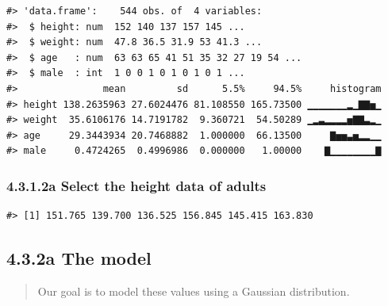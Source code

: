 \documentclass[
  letterpaper,
  DIV=11,
  numbers=noendperiod]{scrreprt}
\newenvironment{Shaded}{\begin{snugshade}}{\end{snugshade}}
\newcommand{\CommentTok}[1]{\textcolor[rgb]{0.37,0.37,0.37}{#1}}
\newcommand{\DecValTok}[1]{\textcolor[rgb]{0.68,0.00,0.00}{#1}}
\newcommand{\DocumentationTok}[1]{\textcolor[rgb]{0.37,0.37,0.37}{\textit{#1}}}
\newcommand{\FunctionTok}[1]{\textcolor[rgb]{0.28,0.35,0.67}{#1}}
\newcommand{\InformationTok}[1]{\textcolor[rgb]{0.37,0.37,0.37}{#1}}
\newcommand{\NormalTok}[1]{\textcolor[rgb]{0.00,0.23,0.31}{#1}}
\newcommand{\OtherTok}[1]{\textcolor[rgb]{0.00,0.23,0.31}{#1}}
\newcommand{\SpecialCharTok}[1]{\textcolor[rgb]{0.37,0.37,0.37}{#1}}
\begin{document}
\begin{verbatim}
#> 'data.frame':    544 obs. of  4 variables:
#>  $ height: num  152 140 137 157 145 ...
#>  $ weight: num  47.8 36.5 31.9 53 41.3 ...
#>  $ age   : num  63 63 65 41 51 35 32 27 19 54 ...
#>  $ male  : int  1 0 0 1 0 1 0 1 0 1 ...
#>               mean         sd      5.5%     94.5%     histogram
#> height 138.2635963 27.6024476 81.108550 165.73500 ▁▁▁▁▁▁▁▂▁▇▇▅▁
#> weight  35.6106176 14.7191782  9.360721  54.50289 ▁▂▃▂▂▂▂▅▇▇▃▂▁
#> age     29.3443934 20.7468882  1.000000  66.13500     ▇▅▅▃▅▂▂▁▁
#> male     0.4724265  0.4996986  0.000000   1.00000    ▇▁▁▁▁▁▁▁▁▇
\end{verbatim}

\hypertarget{a-select-the-height-data-of-adults}{%
\subsubsection{4.3.1.2a Select the height data of
adults}\label{a-select-the-height-data-of-adults}}

\begin{Shaded}
\end{Shaded}

\begin{verbatim}
#> [1] 151.765 139.700 136.525 156.845 145.415 163.830
\end{verbatim}

\hypertarget{a-the-model}{%
\subsection{4.3.2a The model}\label{a-the-model}}

\begin{quote}
Our goal is to model these values using a Gaussian distribution.
\end{quote}
\end{document}

